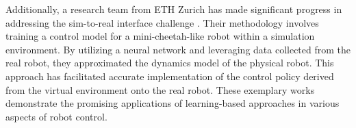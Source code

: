 Additionally, a research team from ETH Zurich has made significant progress in addressing the sim-to-real interface challenge \cite{hwangbo2019learning}. Their methodology involves training a control model for a mini-cheetah-like robot within a simulation environment. By utilizing a neural network and leveraging data collected from the real robot, they approximated the dynamics model of the physical robot. This approach has facilitated accurate implementation of the control policy derived from the virtual environment onto the real robot. These exemplary works demonstrate the promising applications of learning-based approaches in various aspects of robot control.

\cleardoublepage
